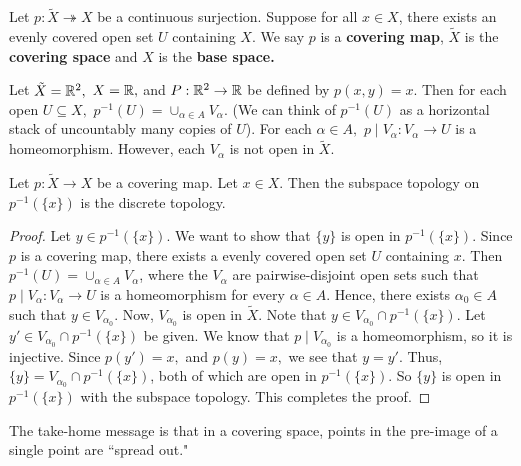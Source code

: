 \begin{definition}  Let $p: \tilde{X} \twoheadrightarrow X$ be a continuous surjection.  Suppose for all $x \in X$, there exists an evenly covered open set $U$ containing $X$.   We say $p$ is a \textbf{covering map}, $\tilde{X}$ is the \textbf{covering space} and $X$ is the \textbf{base space.}
\end{definition}

\begin{example}
Let $\tilde{X}=\mathbb R^2,$ $X=\mathbb R,$ and $P:\mathbb R^2\rightarrow \mathbb R$ be defined by $p(x,y)=x$.  Then for each open $U \subseteq X,$ $p^{-1}(U)=\cup_{\alpha \in A}V_{\alpha}.$  (We can think of $p^{-1}(U)$ as a horizontal stack of uncountably many copies of $U$).  For each $\alpha \in A,$ $p \mid V_{\alpha}: V_{\alpha} \rightarrow U$ is a homeomorphism.  However, each $V_{\alpha}$ is not open in $\tilde{X}$.
\end{example}

\begin{lemma}
Let $p:\tilde{X} \rightarrow X$ be a covering map.  Let $x \in X$.  Then the subspace topology on $p^{-1}(\{x\})$ is the discrete topology.
\end{lemma}

\begin{proof}
Let $y \in p^{-1}(\{x\}).$  We want to show that $\{y\}$ is open in $p^{-1}(\{x\})$.  Since $p$ is a covering map, there exists a evenly covered open set $U$ containing $x$.  Then $p^{-1}(U)=\cup_{\alpha \in A}V_{\alpha}$, where the $V_{\alpha}$ are pairwise-disjoint open sets such that $p \mid V_{\alpha}:V_{\alpha}\rightarrow U$ is a homeomorphism for every $\alpha \in A$.  Hence, there exists $\alpha_0 \in A$ such that $y \in V_{\alpha_0}$.  Now, $V_{\alpha_0}$ is open in $\tilde{X}$.  Note that $y \in V_{\alpha_0}\cap p^{-1}(\{x\})$.  Let $y' \in V_{\alpha_0} \cap p^{-1}(\{x\})$ be given.  We know that $p \mid V_{\alpha_0}$ is a homeomorphism, so it is injective.  Since $p(y')=x,$ and $p(y)=x,$ we see that $y=y'$.  Thus, $\{y\}=V_{\alpha_0} \cap p^{-1}(\{x\})$, both of which are open in $p^{-1}(\{x\}).$ So $\{y\}$ is open in $p^{-1}(\{x\})$ with the subspace topology.  This completes the proof.
\end{proof}

The take-home message is that in a covering space, points in the pre-image of a single point are ``spread out."

